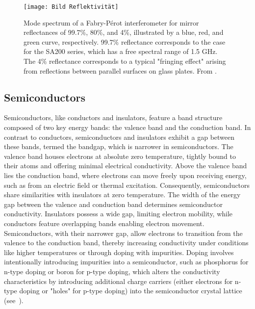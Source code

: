 \begin{figure}[H]
	\centering
	\texttt{[image: Bild Reflektivität]}
	\caption{\glqq Mode spectrum of a Fabry-Pérot interferometer for mirror reflectances of 99.7\%, 80\%, and 4\%, illustrated by a blue, red, and green curve, respectively. 99.7\% reflectance corresponds to the case for the SA200 series, which has a free spectral range of 1.5 GHz. The 4\% reflectance corresponds to a typical "fringing effect" arising from reflections between parallel surfaces on glass plates.\grqq 
		From \autocite{Fabry-Perot_Interferometer_Tutorial}.}
	\label{fig:Reflexivität}
\end{figure}


\subsection{Semiconductors}
Semiconductors, like conductors and insulators, feature a band structure composed of two key energy bands: the valence band and the conduction band. In contrast to conductors, semiconductors and insulators exhibit a gap between these bands, termed the bandgap, which is narrower in semiconductors.
The valence band houses electrons at absolute zero temperature, tightly bound to their atoms and offering minimal electrical conductivity. Above the valence band lies the conduction band, where electrons can move freely upon receiving energy, such as from an electric field or thermal excitation. Consequently, semiconductors share similarities with insulators at zero temperature.
The width of the energy gap between the valence and conduction band determines semiconductor conductivity. Insulators possess a wide gap, limiting electron mobility, while conductors feature overlapping bands enabling electron movement. Semiconductors, with their narrower gap, allow electrons to transition from the valence to the conduction band, thereby increasing conductivity under conditions like higher temperatures or through doping with impurities.
Doping involves intentionally introducing impurities into a semiconductor, such as phosphorus for n-type doping or boron for p-type doping, which alters the conductivity characteristics by introducing additional charge carriers (either electrons for n-type doping or "holes" for p-type doping) into the semiconductor crystal lattice (see~\autocite{simon2013oxford}).

